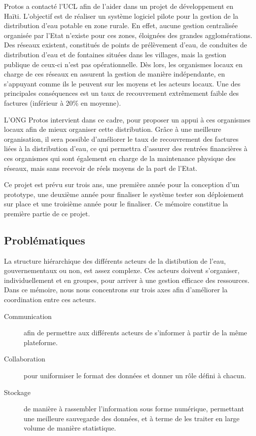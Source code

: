 \documentclass{EPL-master-thesis-covers-FR}
\begin{document}
			Protos a contacté l'UCL afin de l'aider dans un projet de développement en Haïti. L'objectif est de réaliser un système logiciel pilote pour la gestion de la distribution d'eau potable en zone rurale. En effet, aucune gestion centralisée organisée par l'Etat n'existe pour ces zones, éloignées des grandes agglomérations. Des réseaux existent, constitués de points de prélèvement d'eau, de conduites de distribution d'eau et de fontaines situées dans les villages, mais la gestion publique de ceux-ci n'est pas opérationnelle. Dès lors, les organismes locaux en charge de ces réseaux en assurent la gestion de manière indépendante, en s'appuyant comme ils le peuvent sur les moyens et les acteurs locaux. Une des principales conséquences est un taux de recouvrement extrêmement faible des factures (inférieur à 20\% en moyenne).

			L'ONG Protos intervient dans ce cadre, pour proposer un appui à ces organismes locaux afin de mieux organiser cette distribution. Grâce à une meilleure organisation, il sera possible d'améliorer le taux de recouvrement des factures liées à la distribution d'eau, ce qui permettra d'assurer des rentrées financières à ces organismes qui sont également en charge de la maintenance physique des réseaux, mais sans recevoir de réels moyens de la part de l'Etat.

			Ce projet est prévu sur trois ans, une première année pour la conception d'un prototype, une deuxième année pour finaliser le système tester son déploiement sur place et une troisième année pour le finaliser. Ce mémoire constitue la première partie de ce projet.

		\subsection*{Problématiques}

			La structure hiérarchique des différents acteurs de la distibution de l'eau, gouvernementaux ou non, est assez complexe. Ces acteurs doivent s'organiser, individuellement et en groupes, pour arriver à une gestion efficace des ressources. Dans ce mémoire, nous nous concentrons sur trois axes afin d'améliorer la coordination entre ces acteurs.

			\begin{description}
				\item[Communication] afin de permettre aux différents acteurs de s'informer à partir de la même plateforme.
				\item[Collaboration] pour uniformiser le format des données et donner un rôle défini à chacun.
				\item[Stockage] de manière à rassembler l'information sous forme numérique, permettant une meilleure sauvegarde des données, et à terme de les traiter en large volume de manière statistique.
			\end{description}
\end{document}
